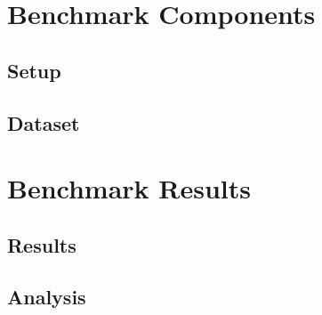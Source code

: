 
\section{Benchmark Components}
\subsection{Setup}
\subsection{Dataset}
\section{Benchmark Results}
\subsection{Results}
\subsection{Analysis}